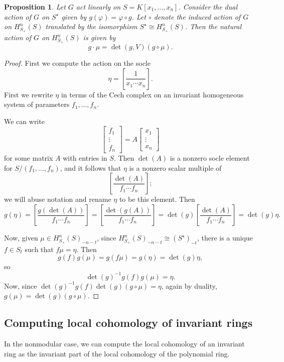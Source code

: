 \documentclass[12pt]{amsart}
\newtheorem{proposition}[theorem]{Proposition}
\theoremstyle{definition}
\numberwithin{equation}{theorem}
\def\phi{\varphi}
\begin{document}
\begin{proposition} Let $G$ act linearly on $S=K[x_1,\dots,x_n]$. Consider the dual action of $G$ on $S^{\star}$ given by $g(\phi) = \phi \circ g$. Let $\circ$ denote the induced action of $G$ on $H^n_{S_+}(S)$ translated by the isomorphism $S^{\star} \cong H^n_{S_+}(S)$.
Then the natural action of $G$ on $H^n_{S_+}(S)$ is given by
\[ g \cdot \mu = \det(g,V) (g\circ\mu).\]
\end{proposition}
\begin{proof}
First we compute the action on the socle 
\[ \eta = \left[ \frac{1}{x_1 \cdots x_n}\right].\]
First we rewrite $\eta$ in terms of the Cech complex on an invariant homogeneous system of parameters $f_1,\dots,f_n$. 

We can write 
\[ \begin{bmatrix} f_1 \\ \vdots \\ f_n\end{bmatrix}  = A \begin{bmatrix} x_1 \\ \vdots \\ x_n\end{bmatrix} \]
for some matrix $A$ with entries in $S$. Then $\det(A)$ is a nonzero socle element for $S/(f_1,\dots,f_n)$, and it follows that $\eta$ is a nonzero scalar multiple of 
\[ \left[ \frac{\det(A)}{f_1 \cdots f_n} \right];\]
we will abuse notation and rename $\eta$ to be this element.
Then
\[ g(\eta) = \left[ \frac{g(\det(A))}{f_1 \cdots f_n} \right] = \left[ \frac{\det(g(A))}{f_1 \cdots f_n} \right] = \det(g) \left[ \frac{ \det(A)}{f_1 \cdots f_n} \right] = \det(g) \eta.\]

Now, given $\mu\in H^n_{S_+}(S)_{-n-t}$, since $H^n_{S_+}(S)_{-n-t} \cong (S^\star)_{-t}$, there is a unique $f\in S_t$ such that $f \mu = \eta$. Then 
\[ g(f) g(\mu) =  g( f \mu) = g(\eta) = \det(g) \eta,\]
so
\[ \det(g)^{-1} g(f) g(\mu) = \eta.\]
Now, since $ \det(g)^{-1} g(f) \det(g) (g\circ\mu) = \eta$, again by duality, $g(\mu)= \det(g) (g\circ\mu)$.
\end{proof}


\subsection*{Computing local cohomology of invariant rings}

In the nonmodular case, we can compute the local cohomology of an invariant ring as the invariant part of the local cohomology of the polynomial ring.
\end{document}
